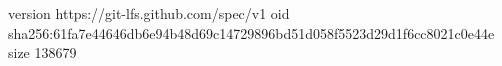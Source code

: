 version https://git-lfs.github.com/spec/v1
oid sha256:61fa7e44646db6e94b48d69c14729896bd51d058f5523d29d1f6cc8021c0e44e
size 138679
